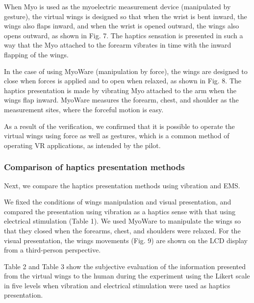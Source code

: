 \documentclass[letterpaper, 10 pt, conference]{ieeeconf}  %
\begin{document}
                        When Myo is used as the myoelectric measurement device (manipulated by gesture), the virtual wings is designed so that when the wrist is bent inward, the wings also flaps inward, and when the wrist is opened outward, the wings also opens outward, as shown in Fig. 7.  
                        The haptics sensation is presented in such a way that the Myo attached to the forearm vibrates in time with the inward flapping of the wings.  

                        In the case of using MyoWare (manipulation by force), the wings are designed to close when forces is applied and to open when relaxed, as shown in Fig. 8.    
                        The haptics presentation is made by vibrating Myo attached to the arm when the wings flap inward.  
                        MyoWare measures the forearm, chest, and shoulder as the measurement sites, where the forceful motion is easy.  

                        As a result of the verification, we confirmed that it is possible to operate the virtual wings using force as well as gestures, which is a common method of operating VR applications, as intended by the pilot.  


                \subsubsection{Comparison of haptics presentation methods}
                        Next, we compare the haptics presentation methods using vibration and EMS.  

                        We fixed the conditions of wings manipulation and visual presentation, and compared the presentation using vibration as a haptics sense with that using electrical stimulation (Table 1).  
                        We used MyoWare to manipulate the wings so that they closed when the forearms, chest, and shoulders were relaxed.  
                        For the visual presentation, the wings movements (Fig. 9) are shown on the LCD display from a third-person perspective.  

                        Table 2 and Table 3 show the subjective evaluation of the information presented from the virtual wings to the human during the experiment using the Likert scale in five levels when vibration and electrical stimulation were used as haptics presentation.  
\end{document}
